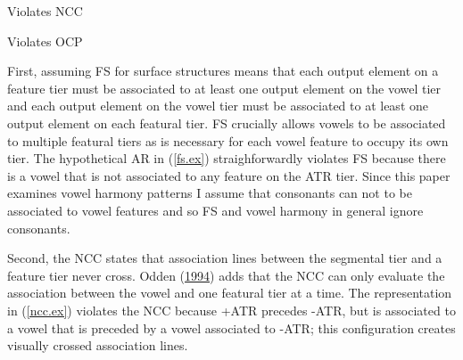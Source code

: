 \documentclass[,doc,floatsintext]{apa6}
\theoremstyle{definition}
\theoremstyle{definition}
\theoremstyle{definition}
\theoremstyle{remark}
\begin{document}
\begin{exe}
\ex \label{ncc.ex} Violates NCC\\
\end{exe}

\begin{exe}
\ex \label{ocp.ex} Violates OCP\\
\end{exe}

First, assuming FS for surface structures means that each output element
on a feature tier must be associated to at least one output element on
the vowel tier and each output element on the vowel tier must be
associated to at least one output element on each featural tier. FS
crucially allows vowels to be associated to multiple featural tiers as
is necessary for each vowel feature to occupy its own tier. The
hypothetical AR in (\ref{fs.ex}) straighforwardly violates FS because
there is a vowel that is not associated to any feature on the ATR tier.
Since this paper examines vowel harmony patterns I assume that
consonants can not to be associated to vowel features and so FS and
vowel harmony in general ignore consonants.

Second, the NCC states that association lines between the segmental tier
and a feature tier never cross. Odden
(\protect\hyperlink{ref-odden1994}{1994}) adds that the NCC can only
evaluate the association between the vowel and one featural tier at a
time. The representation in (\ref{ncc.ex}) violates the NCC because +ATR
precedes -ATR, but is associated to a vowel that is preceded by a vowel
associated to -ATR; this configuration creates visually crossed
association lines.
\end{document}
